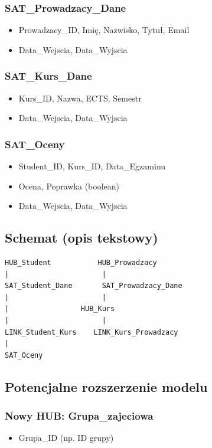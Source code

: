 \documentclass{article}
\begin{document}
\subsubsection*{SAT\_Prowadzacy\_Dane}
\begin{itemize}
  \item Prowadzacy\_ID, Imię, Nazwisko, Tytuł, Email
  \item Data\_Wejscia, Data\_Wyjscia
\end{itemize}

\subsubsection*{SAT\_Kurs\_Dane}
\begin{itemize}
  \item Kurs\_ID, Nazwa, ECTS, Semestr
  \item Data\_Wejscia, Data\_Wyjscia
\end{itemize}

\subsubsection*{SAT\_Oceny}
\begin{itemize}
  \item Student\_ID, Kurs\_ID, Data\_Egzaminu
  \item Ocena, Poprawka (boolean)
  \item Data\_Wejscia, Data\_Wyjscia
\end{itemize}

\newpage

\subsection{Schemat (opis tekstowy)}

\begin{verbatim}
HUB_Student           HUB_Prowadzacy
|                      |
SAT_Student_Dane       SAT_Prowadzacy_Dane
|                      |
|                 HUB_Kurs
|                      |
LINK_Student_Kurs    LINK_Kurs_Prowadzacy
|
SAT_Oceny

\end{verbatim}

\subsection{Potencjalne rozszerzenie modelu}

\subsubsection*{Nowy HUB: Grupa\_zajeciowa}
\begin{itemize}
  \item Grupa\_ID (np. ID grupy)
\end{itemize}
\end{document}
